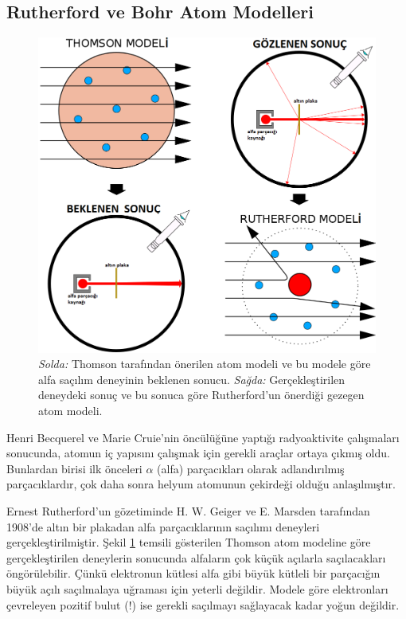 \documentclass[a4paper,12pt, twoside]{article}
\begin{document}
\newpage

\subsection{Rutherford ve Bohr Atom Modelleri}

\begin{figure}[hbtp]
\center
\includegraphics[scale=.5]{Thomson_vs_Rutherford_Atom.png}
\caption{ {\it Solda:} Thomson tarafından önerilen atom modeli ve bu modele göre alfa saçılım deneyinin beklenen sonucu. {\it Sağda:} Gerçekleştirilen deneydeki sonuç ve bu sonuca göre Rutherford'un önerdiği gezegen atom modeli. }
\label{fig:rutherfod_bohr_atom}
\end{figure}

Henri Becquerel ve Marie Cruie'nin öncülüğüne yaptığı radyoaktivite çalışmaları sonucunda, atomun iç yapısını çalışmak için gerekli araçlar ortaya çıkmış oldu. Bunlardan birisi ilk önceleri $\alpha$ (alfa) parçacıkları olarak adlandırılmış parçacıklardır, çok daha sonra helyum atomunun çekirdeği olduğu anlaşılmıştır. 

Ernest Rutherford'un gözetiminde H. W. Geiger  ve E. Marsden tarafından 1908'de altın bir plakadan alfa parçacıklarının saçılımı deneyleri gerçekleştirilmiştir. Şekil \ref{fig:rutherfod_bohr_atom} temsili gösterilen Thomson atom modeline göre gerçekleştirilen deneylerin sonucunda alfaların çok küçük açılarla saçılacakları öngörülebilir. Çünkü elektronun kütlesi alfa gibi büyük kütleli bir parçacığın büyük açılı saçılmalaya uğraması için yeterli değildir. Modele göre elektronları çevreleyen pozitif bulut (!) ise gerekli saçılmayı sağlayacak kadar yoğun değildir.
\end{document}
